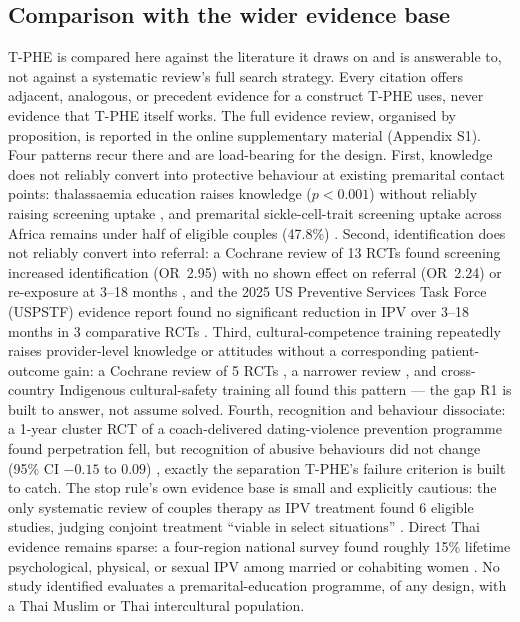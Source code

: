 \documentclass[11pt]{article}
\newcommand{\tphe}{T\mbox{-}PHE}
\begin{document}
\subsection{Comparison with the wider evidence base}
\tphe{} is compared here against the literature it draws on and is answerable to, not against a systematic review's full search strategy. Every citation offers adjacent, analogous, or precedent evidence for a construct \tphe{} uses, never evidence that \tphe{} itself works. The full evidence review, organised by proposition, is reported in the online supplementary material (Appendix S1). Four patterns recur there and are load-bearing for the design. First, knowledge does not reliably convert into protective behaviour at existing premarital contact points: thalassaemia education raises knowledge ($p<0.001$) without reliably raising screening uptake \cite{ref13}, and premarital sickle-cell-trait screening uptake across Africa remains under half of eligible couples (47.8\%) \cite{ref12}. Second, identification does not reliably convert into referral: a Cochrane review of 13 RCTs found screening increased identification (OR~2.95) with no shown effect on referral (OR~2.24) or re-exposure at 3--18 months \cite{ref38}, and the 2025 US Preventive Services Task Force (USPSTF) evidence report found no significant reduction in IPV over 3--18 months in 3 comparative RCTs \cite{ref39,ref40}. Third, cultural-competence training repeatedly raises provider-level knowledge or attitudes without a corresponding patient-outcome gain: a Cochrane review of 5 RCTs \cite{ref55}, a narrower review \cite{ref56}, and cross-country Indigenous cultural-safety training \cite{ref57} all found this pattern --- the gap R1 is built to answer, not assume solved. Fourth, recognition and behaviour dissociate: a 1-year cluster RCT of a coach-delivered dating-violence prevention programme found perpetration fell, but recognition of abusive behaviours did not change (95\% CI $-0.15$ to $0.09$) \cite{ref190}, exactly the separation \tphe{}'s failure criterion is built to catch. The stop rule's own evidence base is small and explicitly cautious: the only systematic review of couples therapy as IPV treatment found 6 eligible studies, judging conjoint treatment ``viable in select situations'' \cite{ref45}. Direct Thai evidence remains sparse: a four-region national survey found roughly 15\% lifetime psychological, physical, or sexual IPV among married or cohabiting women \cite{ref72}. No study identified evaluates a premarital-education programme, of any design, with a Thai Muslim or Thai intercultural population.
\end{document}
